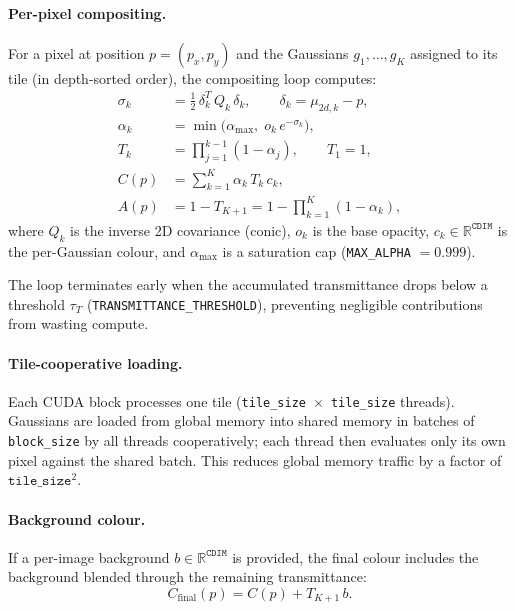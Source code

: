 \documentclass[11pt]{article}
\newcommand{\R}{\mathbb{R}}
\begin{document}
\paragraph{Per-pixel compositing.}
For a pixel at position $p = (p_x, p_y)$ and the Gaussians
$g_1, \dots, g_K$ assigned to its tile (in depth-sorted order), the
compositing loop computes:
\begin{align}
  \sigma_k &= \tfrac{1}{2}\, \delta_k^T\, Q_k\, \delta_k,
  \qquad \delta_k = \mu_{2d,k} - p,
  \label{eq:rast-sigma}\\
  \alpha_k &= \min\!\bigl(\alpha_{\max},\; o_k\, e^{-\sigma_k}\bigr),
  \label{eq:rast-alpha}\\
  T_k &= \prod_{j=1}^{k-1} (1 - \alpha_j),
  \qquad T_1 = 1,
  \label{eq:rast-transmittance}\\
  C(p) &= \sum_{k=1}^{K} \alpha_k\, T_k\, c_k,
  \label{eq:rast-color}\\
  A(p) &= 1 - T_{K+1} = 1 - \prod_{k=1}^{K} (1 - \alpha_k),
  \label{eq:rast-alpha-out}
\end{align}
where $Q_k$ is the inverse 2D covariance (conic), $o_k$ is the base
opacity, $c_k \in \R^{\texttt{CDIM}}$ is the per-Gaussian colour, and
$\alpha_{\max}$ is a saturation cap (\texttt{MAX\_ALPHA} $= 0.999$).

The loop terminates early when the accumulated transmittance drops
below a threshold $\tau_T$ (\texttt{TRANSMITTANCE\_THRESHOLD}),
preventing negligible contributions from wasting compute.

\paragraph{Tile-cooperative loading.}
Each CUDA block processes one tile
(\texttt{tile\_size}~$\times$~\texttt{tile\_size} threads). Gaussians
are loaded from global memory into shared memory in batches of
\texttt{block\_size} by all threads cooperatively; each thread then
evaluates only its own pixel against the shared batch. This reduces
global memory traffic by a factor of $\texttt{tile\_size}^2$.

\paragraph{Background colour.}
If a per-image background $b \in \R^{\texttt{CDIM}}$ is provided, the
final colour includes the background blended through the remaining
transmittance:
\begin{equation}
  C_{\text{final}}(p) = C(p) + T_{K+1}\, b.
  \label{eq:rast-bg}
\end{equation}
\end{document}
